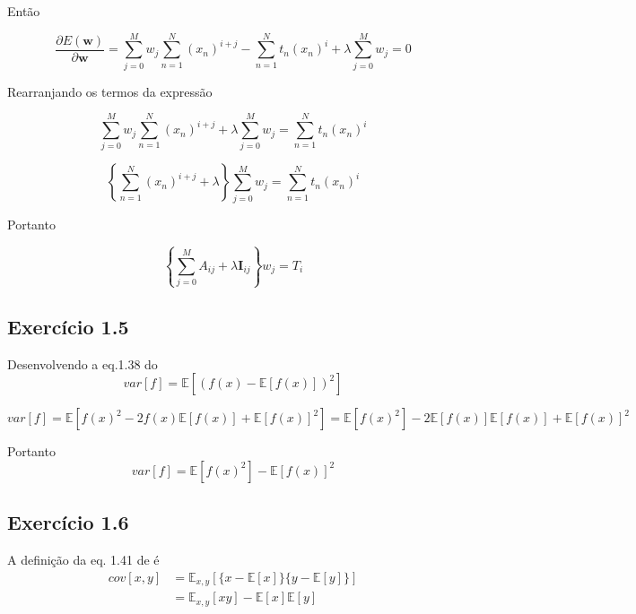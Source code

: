 \documentclass{article}
\begin{document}
    Então
    
    \[
    \frac{\partial E(\mathbf{w})}{\partial \mathbf{w}}=\sum_{j=0}^{M}  w_{j}\sum_{n=1}^{N}(x_{n})^{i+j} - \sum_{n=1}^{N} t_{n}(x_{n})^{i} + \lambda \sum_{j=0}^{M} w_{j}=0
    \] 
    
    Rearranjando os termos da expressão 
    
    \[
    \sum_{j=0}^{M}  w_{j}\sum_{n=1}^{N}(x_{n})^{i+j} + \lambda \sum_{j=0}^{M} w_{j} = \sum_{n=1}^{N} t_{n}(x_{n})^{i} 
    \]
    
    \[
    \left\{\sum_{n=1}^{N}(x_{n})^{i+j} + \lambda\right\} \sum_{j=0}^{M} w_{j} = \sum_{n=1}^{N} t_{n}(x_{n})^{i} 
    \]
    
    Portanto
    
    \[
    \left\{\sum_{j=0}^{M} A_{ij} + \lambda\mathbf{I}_{ij} \right\}  w_{j} = T_{i} 
    \]
    
\subsection{ Exerc\'icio 1.5}

  Desenvolvendo a eq.1.38 do \cite{Bishop2006}
     \begin{equation}
     	var[f]=\mathbb{E}[(f(x)-\mathbb{E}[f(x)])^{2}]             
     \end{equation}
    
     \[
      var[f]= \mathbb{E}[f(x)^{2}-2f(x)\mathbb{E}[f(x)]+\mathbb{E}[f(x)]^{2}]= \mathbb{E}[f(x)^{2}] -2\mathbb{E}[f(x)] \mathbb{E}[f(x)]+\mathbb{E}[f(x)]^{2}  
     \]
      
      Portanto
     \[ var[f]=\mathbb{E}[f(x)^{2}]-\mathbb{E}[f(x)]^{2} \]
     

\subsection{ Exerc\'icio 1.6}

    A definição da eq. 1.41 de \cite{Bishop2006} é
	\begin{equation}
		\begin{aligned}
			  cov[x,y] & = \mathbb{E}_{x,y}[\{x-\mathbb{E}[x]\}\{y-\mathbb{E}[y]\}] \\
				& = \mathbb{E}_{x,y}[xy]-\mathbb{E}[x]\mathbb{E}[y]
		\end{aligned}                                                  \label{eq124_ML}
	\end{equation}
	   
\end{document}
